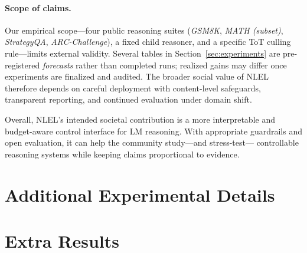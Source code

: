 \documentclass{article}
\theoremstyle{plain}
\theoremstyle{definition}
\theoremstyle{remark}
\begin{document}
\paragraph{Scope of claims.}
Our empirical scope---four public reasoning suites
(\emph{GSM8K}, \emph{MATH (subset)}, \emph{StrategyQA}, \emph{ARC-Challenge}),
a fixed child reasoner, and a specific ToT culling rule---limits external
validity. Several tables in Section~\ref{sec:experiments} are pre-registered
\emph{forecasts} rather than completed runs; realized gains may differ once
experiments are finalized and audited. The broader social value of NLEL
therefore depends on careful deployment with content-level safeguards,
transparent reporting, and continued evaluation under domain shift.

Overall, NLEL’s intended societal contribution is a more interpretable and
budget-aware control interface for LM reasoning. With appropriate guardrails
and open evaluation, it can help the community study---and stress-test---
controllable reasoning systems while keeping claims proportional to
evidence.





\appendix

\section{Additional Experimental Details}
\section{Extra Results}
\end{document}
